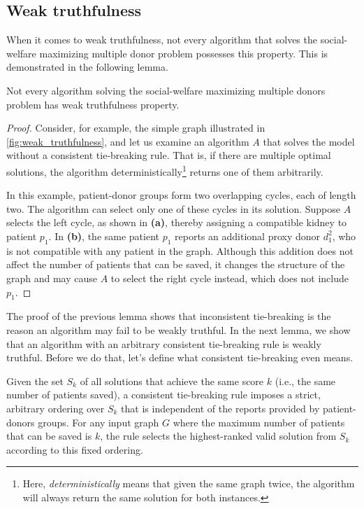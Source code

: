 \subsection{Weak truthfulness}
When it comes to weak truthfulness, not every algorithm that solves the social-welfare maximizing multiple donor problem possesses this property. This is demonstrated in the following lemma.

\begin{lemma}
\label{lemma:weak_truthfulness_false}
    Not every algorithm solving the social-welfare maximizing multiple donors problem has weak truthfulness property.
    \begin{proof}
        Consider, for example, the simple graph illustrated in \autoref{fig:weak_truthfulness}, and let us examine an algorithm $A$ that solves the model without a consistent tie-breaking rule. That is, if there are multiple optimal solutions, the algorithm deterministically\footnote{Here, \textit{deterministically} means that given the same graph twice, the algorithm will always return the same solution for both instances.} returns one of them arbitrarily.
    
        In this example, patient-donor groups form two overlapping cycles, each of length two. The algorithm can select only one of these cycles in its solution. Suppose $A$ selects the left cycle, as shown in \textbf{(a)}, thereby assigning a compatible kidney to patient $p_1$. In \textbf{(b)}, the same patient $p_1$ reports an additional proxy donor $d_1^2$, who is not compatible with any patient in the graph. Although this addition does not affect the number of patients that can be saved, it changes the structure of the graph and may cause $A$ to select the right cycle instead, which does not include $p_1$.
    \end{proof}
\end{lemma}

The proof of the previous lemma shows that inconsistent tie-breaking is the reason an algorithm may fail to be weakly truthful. In the next lemma, we show that an algorithm with an arbitrary consistent tie-breaking rule is weakly truthful. Before  we do that, let's define what consistent tie-breaking even means.

\begin{definition}
\label{consistent_tie_breaking_rule}
    Given the set $S_k$ of all solutions that achieve the same score $k$ (i.e., the same number of patients saved), a consistent tie-breaking rule imposes a strict, arbitrary ordering over $S_k$ that is independent of the reports provided by patient-donors groups. For any input graph $G$ where the maximum number of patients that can be saved is $k$, the rule selects the highest-ranked valid solution from $S_k$ according to this fixed ordering.
\end{definition}

